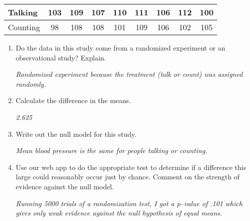 \begin{enumerate}
\begin{tabular}{|l|c|c|c|c|c|c|c|c|}\hline
 Talking & 103& 109& 107& 110& 111& 106& 112& 100\\ \hline
 Counting& 98& 108& 108& 101& 109& 106& 102& 105\\ \hline
\end{tabular}

\begin{enumerate}
     \item  Do the data in this study come from a randomized
       experiment or an observational study?  Explain. 
\begin{students}
  \vspace*{\fill}
\end{students} 

\begin{key}
  {\it Randomized experiment because the treatment (talk or count) was
    assigned randomly.}
\end{key}
     \item  Calculate the difference in the means. 
\begin{students}
  \vspace*{\fill}
\end{students} 

\begin{key}
  {\it 2.625}
\end{key}
     \item  Write out the null model for this study.
\begin{students}
  \vspace*{\fill}
\end{students} 

\begin{key}
  {\it Mean blood pressure is the same for people talking or counting.}
\end{key}
     \item  Use our web app to do the appropriate test to determine if a
       difference this large could reasonably occur just by chance.
       Comment on the strength of evidence against
       the null model.
\begin{students}
  \vspace*{\fill}
\end{students} 


\begin{key}
  {\it Running 5000 trials of a randomization test, I got a p--value of
    .101 which gives only weak evidence against the null hypothesis of
    equal means.}
\end{key}
     \end{enumerate}
     

\end{enumerate}
